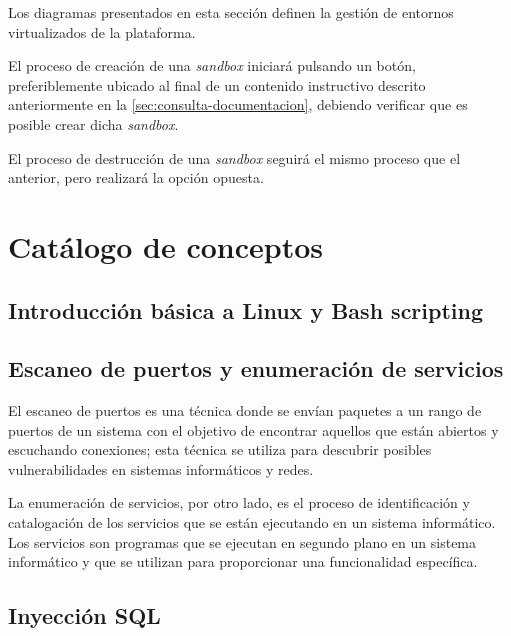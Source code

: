             Los diagramas presentados en esta sección definen la gestión de entornos virtualizados de la plataforma.
            
            El proceso de creación de una \textit{sandbox} iniciará pulsando un botón, preferiblemente ubicado al final de un contenido instructivo descrito anteriormente en la \autoref{sec:consulta-documentacion}, debiendo verificar que es posible crear dicha \textit{sandbox}.
            
            El proceso de destrucción de una \textit{sandbox} seguirá el mismo proceso que el anterior, pero realizará la opción opuesta.
            
            \newpage
        
        
    \section{Catálogo de conceptos}
        \label{sec:catalogo}

        \subsection{Introducción básica a Linux y Bash scripting}

            
    
        \subsection{Escaneo de puertos y enumeración de servicios}
        
            El escaneo de puertos es una técnica donde se envían paquetes a un rango de puertos de un sistema con el objetivo de encontrar aquellos que están abiertos y escuchando conexiones; esta técnica se utiliza para descubrir posibles vulnerabilidades en sistemas informáticos y redes.
            
            La enumeración de servicios, por otro lado, es el proceso de identificación y catalogación de los servicios que se están ejecutando en un sistema informático. Los servicios son programas que se ejecutan en segundo plano en un sistema informático y que se utilizan para proporcionar una funcionalidad específica.
            
            
        \subsection{Inyección SQL}
            
